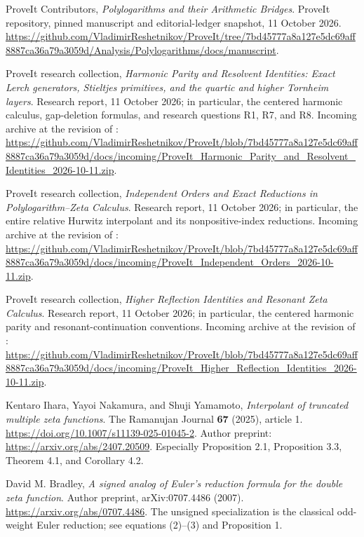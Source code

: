 
ProveIt Contributors,
\emph{Polylogarithms and their Arithmetic Bridges}.
ProveIt repository, pinned manuscript and editorial-ledger snapshot,
11 October 2026.
\url{https://github.com/VladimirReshetnikov/ProveIt/tree/7bd45777a8a127e5dc69aff8887ca36a79a3059d/Analysis/Polylogarithms/docs/manuscript}.

ProveIt research collection,
\emph{Harmonic Parity and Resolvent Identities:
Exact Lerch generators, Stieltjes primitives, and the quartic and higher
Tornheim layers}.
Research report, 11 October 2026; in particular, the centered harmonic
calculus, gap-deletion formulas, and research questions R1, R7, and R8.
Incoming archive at the revision of \cite{Repository}:
\url{https://github.com/VladimirReshetnikov/ProveIt/blob/7bd45777a8a127e5dc69aff8887ca36a79a3059d/docs/incoming/ProveIt_Harmonic_Parity_and_Resolvent_Identities_2026-10-11.zip}.

ProveIt research collection,
\emph{Independent Orders and Exact Reductions in Polylogarithm--Zeta
Calculus}.
Research report, 11 October 2026; in particular, the entire relative
Hurwitz interpolant and its nonpositive-index reductions.
Incoming archive at the revision of \cite{Repository}:
\url{https://github.com/VladimirReshetnikov/ProveIt/blob/7bd45777a8a127e5dc69aff8887ca36a79a3059d/docs/incoming/ProveIt_Independent_Orders_2026-10-11.zip}.

ProveIt research collection,
\emph{Higher Reflection Identities and Resonant Zeta Calculus}.
Research report, 11 October 2026; in particular, the centered harmonic
parity and resonant-continuation conventions.
Incoming archive at the revision of \cite{Repository}:
\url{https://github.com/VladimirReshetnikov/ProveIt/blob/7bd45777a8a127e5dc69aff8887ca36a79a3059d/docs/incoming/ProveIt_Higher_Reflection_Identities_2026-10-11.zip}.

Kentaro Ihara, Yayoi Nakamura, and Shuji Yamamoto,
\emph{Interpolant of truncated multiple zeta functions}.
The Ramanujan Journal \textbf{67} (2025), article 1.
\url{https://doi.org/10.1007/s11139-025-01045-2}.
Author preprint: \url{https://arxiv.org/abs/2407.20509}.
Especially Proposition 2.1, Proposition 3.3, Theorem 4.1,
and Corollary 4.2.

David M. Bradley,
\emph{A signed analog of Euler's reduction formula for the double zeta
function}.
Author preprint, arXiv:0707.4486 (2007).
\url{https://arxiv.org/abs/0707.4486}.
The unsigned specialization is the classical odd-weight Euler reduction;
see equations (2)--(3) and Proposition 1.

